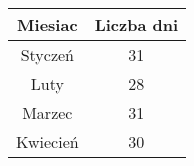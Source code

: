 \begin{table}[h!]
    \centering
    \begin{tabular}{|c|c|}
    \hline
    \textbf{Miesiac} & \textbf{Liczba dni}    \\ \hline
    Styczeń          & 31                     \\ \hline
    Luty             & 28                     \\ \hline
    Marzec           & 31                     \\ \hline
    Kwiecień         & 30                     \\ \hline
    \end{tabular}
    \label{table:num}
\end{table}